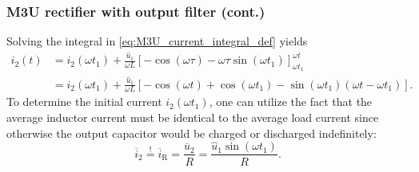 \begin{frame}
    \frametitle{M3U rectifier with output filter (cont.)}
    Solving the integral in \eqref{eq:M3U_current_integral_def} yields
    \begin{equation}
        \begin{split}
            i_2(t) &= i_2(\omega t_1) + \frac{\hat{u}_1}{\omega L} \left[-\cos(\omega \tau) -\omega\tau\sin(\omega t_1) \right]_{\omega t_1}^{\omega t} \\ &= i_2(\omega t_1) + \frac{\hat{u}_1}{\omega L} \left[-\cos(\omega t) + \cos(\omega t_1) -\sin(\omega t_1)\left(\omega t - \omega t_1\right)\right].
        \end{split}
         \label{eq:M3U_current_integral}
    \end{equation}
    To determine the initial current $i_2(\omega t_1)$, one can utilize the fact that the average inductor current must be identical to the average load current since otherwise the output capacitor would be charged or discharged indefinitely:
    \begin{equation}
        \overline{i}_2 \stackrel{!}{=} \overline{i}_\mathrm{R} = \frac{\overline{u}_2}{R} = \frac{\hat{u}_1\sin(\omega t_1)}{R}. 
        \label{eq:M3U_current_average}
    \end{equation}
\end{frame}

